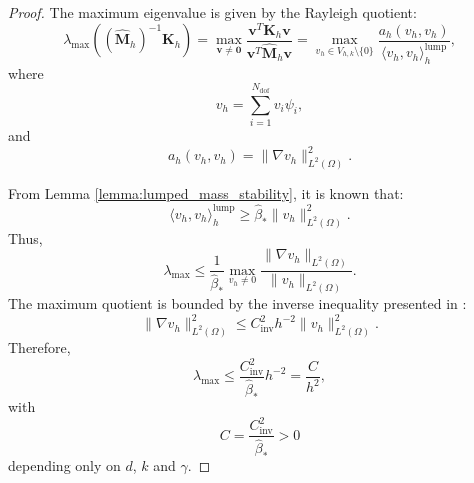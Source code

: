 \documentclass{article}
\newcommand{\K}{\mathbf{K}_h}
\newcommand{\M}{\hat{\mathbf{M}}_h}
\newcommand{\lebesguespace}[1]{L^2(#1)}
\begin{document}
\begin{proof}
    The maximum eigenvalue is given by the Rayleigh quotient:
    \begin{equation} 
        \nonumber
        \lambda_{\max} \left( (\M)^{-1} \K \right) = \max \limits_{\mathbf{v} \neq \mathbf{0}} \frac{\mathbf{v}^T \K \mathbf{v}}{\mathbf{v}^T \M \mathbf{v}} = \max \limits_{v_h \in V_{h,k} \setminus \{0\}} \frac{a_h(v_h, v_h)}{\langle v_h, v_h\rangle^{\text{lump}}_h},
    \end{equation}
    where
    \begin{equation}
        \nonumber
        v_h = \sum \limits^{N_{\text{dof}}}_{i=1} v_i \psi_i,
    \end{equation}
    and
    \begin{equation}
        \nonumber
        a_h(v_h, v_h) = \| \nabla v_h \|^2_{\lebesguespace{\Omega}}.
    \end{equation}

    From Lemma \ref{lemma:lumped_mass_stability}, it is known that:
    \begin{equation}
        \nonumber
        \langle v_h, v_h \rangle^{\text{lump}}_h \geq \hat{\beta}_* \| v_h \|^2_{\lebesguespace{\Omega}}.
    \end{equation}
    Thus,
    \begin{equation}
        \nonumber
        \lambda_{\max} \leq \frac{1}{\hat{\beta}_*} \max \limits_{v_h \neq 0}\frac{\| \nabla v_h \|_{\lebesguespace{\Omega}}}{\| v_h \|_{\lebesguespace{\Omega}}}.
    \end{equation}
    The maximum quotient is bounded by the inverse inequality presented in \cite{beirao2013vem}:
    \begin{equation}
        \nonumber
        \| \nabla v_h \|^2_{\lebesguespace{\Omega}} \leq C_{\text{inv}}^2 h^{-2} \| v_h \|^2_{\lebesguespace{\Omega}}.
    \end{equation}
    Therefore,
    \begin{equation}
        \nonumber
        \lambda_{\max} \leq \frac{C^2_{\text{inv}}}{\hat{\beta}_*}h^{-2} = \frac{C}{h^2},
    \end{equation}
    with
    \begin{equation}
        \nonumber
        C = \frac{C^2_{\text{inv}}}{\hat{\beta}_*} > 0
    \end{equation}
    depending only on $d$, $k$ and $\gamma$.
\end{proof}


\end{document}
